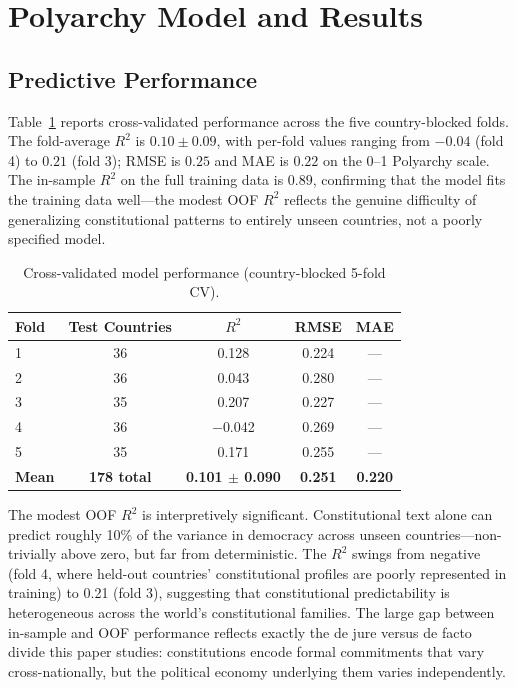 \documentclass[9pt,twoside]{pnas-new}
\begin{document}
\section*{Polyarchy Model and Results}

\subsection*{Predictive Performance}

Table~\ref{tab:model_performance} reports cross-validated performance across the five country-blocked folds. The fold-average $R^2$ is $0.10 \pm 0.09$, with per-fold values ranging from $-0.04$ (fold 4) to $0.21$ (fold 3); RMSE is $0.25$ and MAE is $0.22$ on the 0--1 Polyarchy scale. The in-sample $R^2$ on the full training data is $0.89$, confirming that the model fits the training data well---the modest OOF $R^2$ reflects the genuine difficulty of generalizing constitutional patterns to entirely unseen countries, not a poorly specified model.

\begin{table}[t!]
\centering
\caption{Cross-validated model performance (country-blocked 5-fold CV).}
\label{tab:model_performance}
\begin{tabular}{lcccc}
\textbf{Fold} & \textbf{Test Countries} & $R^2$ & \textbf{RMSE} & \textbf{MAE} \\
\midrule
1 & 36 & 0.128 & 0.224 & --- \\
2 & 36 & 0.043 & 0.280 & --- \\
3 & 35 & 0.207 & 0.227 & --- \\
4 & 36 & $-$0.042 & 0.269 & --- \\
5 & 35 & 0.171 & 0.255 & --- \\
\midrule
\textbf{Mean} & \textbf{178 total} & \textbf{0.101 $\pm$ 0.090} & \textbf{0.251} & \textbf{0.220} \\
\bottomrule
\end{tabular}
\end{table}

The modest OOF $R^2$ is interpretively significant. Constitutional text alone can predict roughly 10\% of the variance in democracy across unseen countries---non-trivially above zero, but far from deterministic. The $R^2$ swings from negative (fold 4, where held-out countries' constitutional profiles are poorly represented in training) to 0.21 (fold 3), suggesting that constitutional predictability is heterogeneous across the world's constitutional families. The large gap between in-sample and OOF performance reflects exactly the de jure versus de facto divide this paper studies: constitutions encode formal commitments that vary cross-nationally, but the political economy underlying them varies independently.
\end{document}
